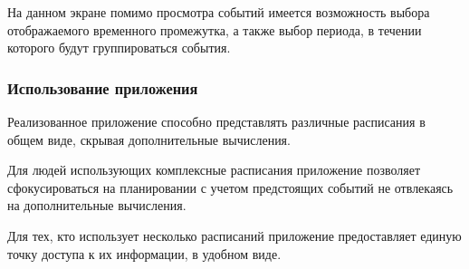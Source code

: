 
На данном экране помимо просмотра событий имеется возможность выбора отображаемого временного промежутка, а также выбор периода, в течении которого будут группироваться события.

\subsubsection{Использование приложения}

Реализованное приложение способно представлять различные расписания в общем виде, скрывая дополнительные вычисления.

Для людей использующих комплексные расписания приложение позволяет сфокусироваться на планировании с учетом предстоящих событий не отвлекаясь на дополнительные вычисления.

Для тех, кто использует несколько расписаний приложение предоставляет единую точку доступа к их информации, в удобном виде.

\clearpage